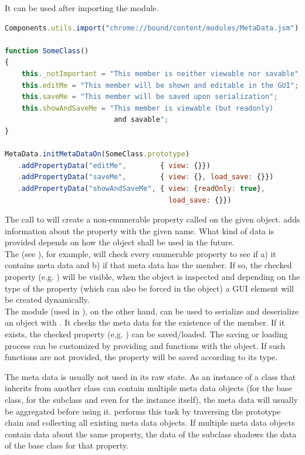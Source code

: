 It can be used after importing the  module.

\SingleSpacing
\begin{lstlisting}[language=JavaScript, caption=Adding meta data to \myProperName{JavaScript} objects]
Components.utils.import("chrome://bound/content/modules/MetaData.jsm")

function SomeClass()
{
	this._notImportant = "This member is neither viewable nor savable";
	this.editMe = "This member will be shown and editable in the GUI";
	this.saveMe = "This member will be saved upon serialization";
	this.showAndSaveMe = "This member is viewable (but readonly)
	                      and savable";
}

MetaData.initMetaDataOn(SomeClass.prototype)
   .addPropertyData("editMe",        { view: {}})
   .addPropertyData("saveMe",        { view: {}, load_save: {}})
   .addPropertyData("showAndSaveMe", { view: {readOnly: true}, 
                                       load_save: {}})
\end{lstlisting}
\OnehalfSpacing

The call to  will create a non-enumerable property called  on the given object.  adds information about the property with the given name. What kind of data is provided depends on how the object shall be used in the future.
\\The {} (see ), for example, will check every enumerable property to see if a) it contains meta data and b) if that meta data has the  member. If so, the checked property (e.g. ) will be visible, when the object is inspected and depending on the type of the property (which can also be forced in the  object) a GUI element will be created dynamically.
\\The {} module  (used in ), on the other hand, can be used to serialize and deserialize an object with . It checks the meta data for the existence of the  member. If it exists, the checked property (e.g. ) can be saved/loaded. The saving or loading process can be customized by providing  and  functions with the  object. If such functions are not provided, the property will be saved according to its type.

The meta data is usually not used in its raw state. As an instance of a class that inherits from another class can contain multiple meta data objects (for the base class, for the subclass and even for the instance itself), the meta data will usually be aggregated before using it.  performs this task by traversing the prototype chain and collecting all existing meta data objects. If multiple meta data objects contain data about the same property, the data of the subclass shadows the data of the base class for that property.

